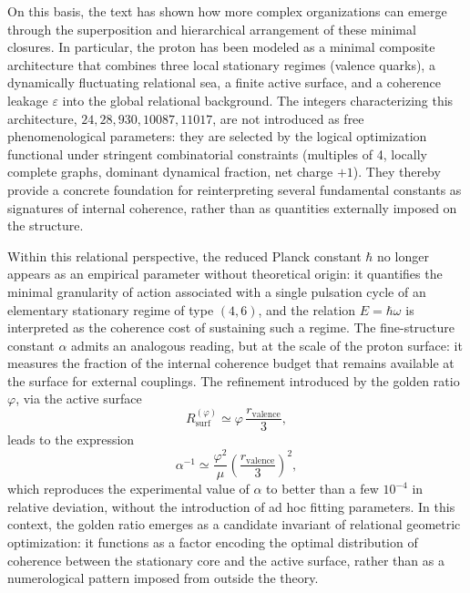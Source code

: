 \documentclass[11pt,a4paper]{article}
\begin{document}
On this basis, the text has shown how more complex organizations can emerge through the superposition and hierarchical arrangement of these minimal closures. In particular, the proton has been modeled as a minimal composite architecture that combines three local stationary regimes (valence quarks), a dynamically fluctuating relational sea, a finite active surface, and a coherence leakage \(\varepsilon\) into the global relational background. The integers characterizing this architecture, \(24, 28, 930, 10087, 11017\), are not introduced as free phenomenological parameters: they are selected by the logical optimization functional under stringent combinatorial constraints (multiples of 4, locally complete graphs, dominant dynamical fraction, net charge \(+1\)). They thereby provide a concrete foundation for reinterpreting several fundamental constants as signatures of internal coherence, rather than as quantities externally imposed on the structure.

Within this relational perspective, the reduced Planck constant \(\hbar\) no longer appears as an empirical parameter without theoretical origin: it quantifies the minimal granularity of action associated with a single pulsation cycle of an elementary stationary regime of type \((4,6)\), and the relation \(E = \hbar \omega\) is interpreted as the coherence cost of sustaining such a regime. The fine-structure constant \(\alpha\) admits an analogous reading, but at the scale of the proton surface: it measures the fraction of the internal coherence budget that remains available at the surface for external couplings. The refinement introduced by the golden ratio \(\varphi\), via the active surface
\[
R_{\operatorname{surf}}^{(\varphi)} \simeq \varphi \,\frac{r_{\mathrm{valence}}}{3},
\]
leads to the expression
\[
\alpha^{-1} \simeq \frac{\varphi^{2}}{\mu} \left(\frac{r_{\mathrm{valence}}}{3}\right)^{2},
\]
which reproduces the experimental value of \(\alpha\) to better than a few \(10^{-4}\) in relative deviation, without the introduction of ad hoc fitting parameters. In this context, the golden ratio emerges as a candidate invariant of relational geometric optimization: it functions as a factor encoding the optimal distribution of coherence between the stationary core and the active surface, rather than as a numerological pattern imposed from outside the theory.
\end{document}
